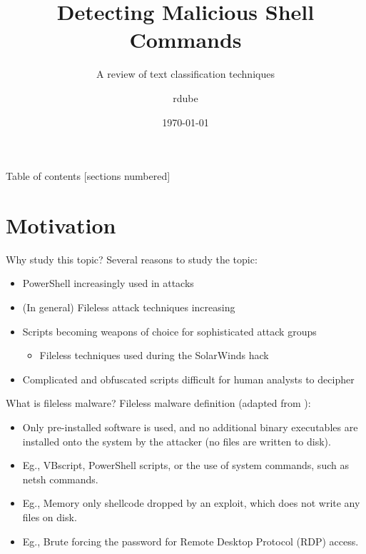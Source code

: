 \documentclass[10pt]{beamer}
\title{Detecting Malicious Shell Commands}
\subtitle{A review of text classification techniques}
\date{\today}
\author{rdube}
\begin{document}
\maketitle

\begin{frame}{Table of contents}
  [sections numbered]
  \tableofcontents[hideallsubsections]
\end{frame}

\section{Motivation}

\begin{frame}[fragile]{Why study this topic?}
	Several reasons to study the topic:
	\begin{itemize}
		\item PowerShell increasingly used in attacks \cite{symc2016}
		\item (In general) Fileless attack techniques increasing \cite{symc2017}
		\item Scripts becoming weapons of choice for sophisticated attack groups \cite{msft2017-2}
		\begin{itemize}
			\item Fileless techniques used during the SolarWinds hack \cite{volexity2020,zdnet2021}
		\end{itemize}
		\item Complicated and obfuscated scripts difficult for human analysts to decipher \cite{feye2018}
	\end{itemize}
\end{frame}

\begin{frame}{What is fileless malware?}
	Fileless malware definition (adapted from \cite{symc2017}):
	\begin{itemize}
		\item Only pre-installed software is used, and no additional binary executables are installed onto the system by the attacker (no files are written to disk).
		\item Eg., VBscript, PowerShell scripts, or the use of system commands, such as netsh commands.
		\item Eg., Memory only shellcode dropped by an exploit, which does not write any files on disk. 
		\item Eg., Brute forcing the password for Remote Desktop Protocol (RDP) access.
	\end{itemize}
\end{frame}
\end{document}
